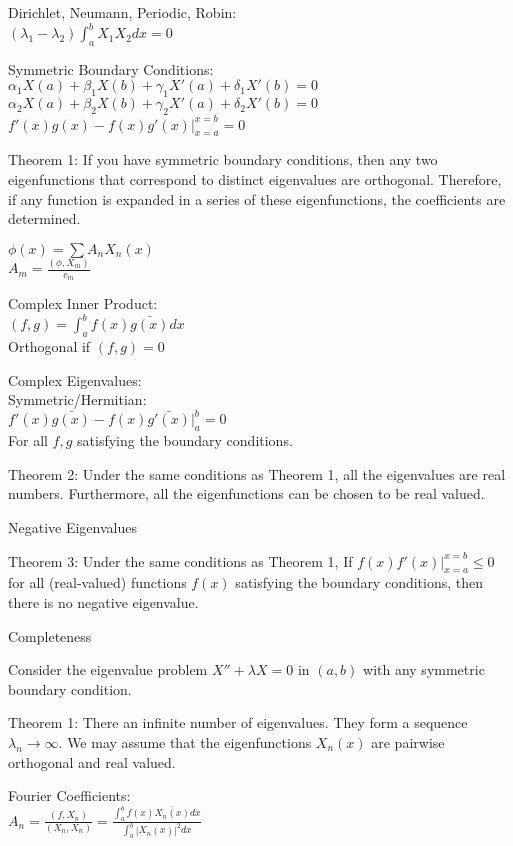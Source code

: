 Dirichlet, Neumann, Periodic, Robin: \\
$(\lambda_1 - \lambda_2) \int_a^b X_1 X_2 dx = 0$

Symmetric Boundary Conditions: \\
$\alpha_1 X(a) + \beta_1 X(b) + \gamma_1 X'(a) + \delta_1 X'(b)=0$ \\
$\alpha_2 X(a) + \beta_2 X(b) + \gamma_2 X'(a) + \delta_2 X'(b)=0$ \\
$f'(x)g(x)-f(x)g'(x) |_{x=a}^{x=b} = 0$

Theorem 1: If you have symmetric boundary conditions, then any two eigenfunctions that correspond to distinct eigenvalues are orthogonal. Therefore, if any function is expanded in a series of these eigenfunctions, the coefficients are determined.

$\phi (x) = \sum A_n X_n (x)$ \\
$A_m = \frac{(\phi , X_m)}{c_m}$

Complex Inner Product: \\
$(f,g)=\int_a^b f(x)\bar{g(x)} dx$ \\
Orthogonal if $(f,g)=0$

Complex Eigenvalues: \\
Symmetric/Hermitian: \\
$f'(x)\bar{g(x)}-f(x)\bar{g'(x)} |_a^b = 0$ \\
For all $f,g$ satisfying the boundary conditions.

Theorem 2: Under the same conditions as Theorem 1, all the eigenvalues are real numbers. Furthermore, all the eigenfunctions can be chosen to be real valued.

Negative Eigenvalues

Theorem 3: Under the same conditions as Theorem 1, If $f(x)f'(x) |_{x=a}^{x=b} \le 0$ for all (real-valued) functions $f(x)$ satisfying the boundary conditions, then there is no negative eigenvalue.

Completeness

Consider the eigenvalue problem $X''+\lambda X = 0$ in $(a,b)$ with any symmetric boundary condition.

Theorem 1: There an infinite number of eigenvalues. They form a sequence $\lambda_n \to \infty$. We may assume that the eigenfunctions $X_n (x)$ are pairwise orthogonal and real valued.

Fourier Coefficients: \\
$A_n = \frac{(f,X_n)}{(X_n,X_n)} = \frac{\int_a^b f(x) \bar{X_n (x)} dx}{\int_a^b |X_n (x)|^2 dx}$

